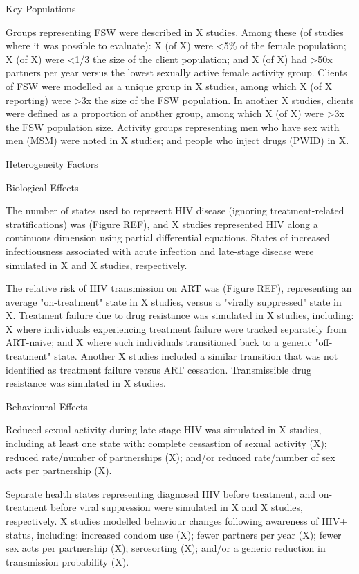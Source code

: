 Key Populations

Groups representing FSW were described in X studies.
Among these (of studies where it was possible to evaluate):
X (of X) were {<5\%} of the female population;
X (of X) were {<1/3} the size of the client population; and
X (of X) had {>50x} partners per year versus
the lowest sexually active female activity group.
Clients of FSW were modelled as a unique group in X studies,
among which X (of X reporting)
were {>3x} the size of the FSW population.
In another X studies, clients were defined as a proportion of another group,
among which X (of X)
were {>3x} the FSW population size.
Activity groups representing
men who have sex with men (MSM) were noted in X studies; and
people who inject drugs (PWID) in X.

Heterogeneity Factors

Biological Effects

The \xdmdef number of states used to represent HIV disease
(ignoring treatment-related stratifications) was  (Figure REF),
and X studies represented HIV along a continuous dimension
using partial differential equations.
States of increased infectiousness associated with acute infection and late-stage disease
were simulated in X and X studies, respectively.

The relative risk of HIV transmission on ART was 
(Figure REF),
representing an average "on-treatment" state in X studies,
versus a "virally suppressed" state in X.
Treatment failure due to drug resistance was simulated in X studies, including:
X where individuals experiencing treatment failure
were tracked separately from ART-naive; and
X where such individuals
transitioned back to a generic "off-treatment" state.
Another X studies included a similar transition
that was not identified as treatment failure versus ART cessation.
Transmissible drug resistance was simulated in X studies.

Behavioural Effects

Reduced sexual activity during late-stage HIV was simulated in X studies,
including at least one state with:
complete cessastion of sexual activity (X);
reduced rate/number of partnerships (X); and/or
reduced rate/number of sex acts per partnership (X).

Separate health states representing diagnosed HIV before treatment,
and on-treatment before viral suppression were simulated in
X and X studies, respectively.
X studies modelled behaviour changes following awareness of HIV+ status, including:
increased condom use (X);
fewer partners per year (X);
fewer sex acts per partnership (X);
serosorting (X); and/or
a generic reduction in transmission probability (X).

